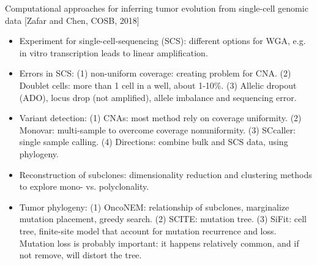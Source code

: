 \documentclass{report}
\begin{document}
Computational approaches for inferring tumor evolution from single-cell genomic data [Zafar and Chen, COSB, 2018]
\begin{itemize}
	
	\item Experiment for single-cell-sequencing (SCS): different options for WGA, e.g. in vitro transcription leads to linear amplification. 
	
	\item Errors in SCS: (1) non-uniform coverage: creating problem for CNA. (2) Doublet cells: more than 1 cell in a well, about 1-10\%. (3) Allelic dropout (ADO), locus drop (not amplified), allele imbalance and sequencing error. 
	
	\item Variant detection: (1) CNAs: most method rely on coverage uniformity. (2) Monovar: multi-sample to overcome coverage nonuniformity. (3) SCcaller: single sample calling. (4) Directions: combine bulk and SCS data, using phylogeny. 
	
	\item Reconstruction of subclones: dimensionality reduction and clustering methods to explore mono- vs. polyclonality. 
	
	\item Tumor phylogeny: (1) OncoNEM: relationship of subclones, marginalize mutation placement, greedy search. (2) SCITE: mutation tree. (3) SiFit: cell tree, finite-site model that account for mutation recurrence and loss. Mutation loss is probably important: it happens relatively common, and if not remove, will distort the tree. 
\end{itemize}
\end{document}
